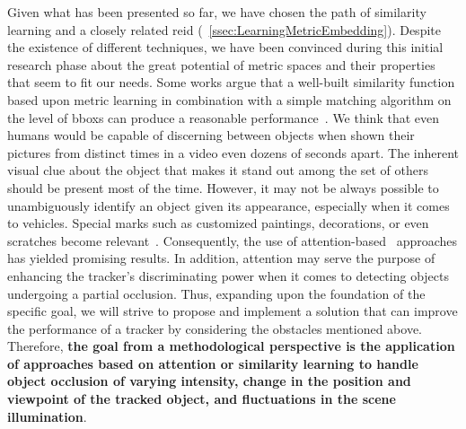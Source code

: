 Given what has been presented so far, we have chosen the path of similarity learning and a closely related \gls{reid} (\sectiontext{}~\ref{ssec:LearningMetricEmbedding}). Despite the existence of different techniques, we have been convinced during this initial research phase about the great potential of metric spaces and their properties that seem to fit our needs. Some works argue that a well-built similarity function based upon metric learning in combination with a simple matching algorithm on the level of \glspl{bbox} can produce a reasonable performance~\cite{tao2016sint}. We think that even humans would be capable of discerning between objects when shown their pictures from distinct times in a video even dozens of seconds apart. The inherent visual clue about the object that makes it stand out among the set of others should be present most of the time. However, it may not be always possible to unambiguously identify an object given its appearance, especially when it comes to vehicles. Special marks such as customized paintings, decorations, or even scratches become relevant~\cite{liu2016ssd}. Consequently, the use of attention-based~\cite{vaswani2017attention} approaches has yielded promising results. In addition, attention may serve the purpose of enhancing the tracker's discriminating power when it comes to detecting objects undergoing a partial occlusion. Thus, expanding upon the foundation of the specific goal, we will strive to propose and implement a solution that can improve the performance of a tracker by considering the obstacles mentioned above. Therefore, \textbf{the goal from a methodological perspective is the application of approaches based on attention or similarity learning to handle object occlusion of varying intensity, change in the position and viewpoint of the tracked object, and fluctuations in the scene illumination}.
